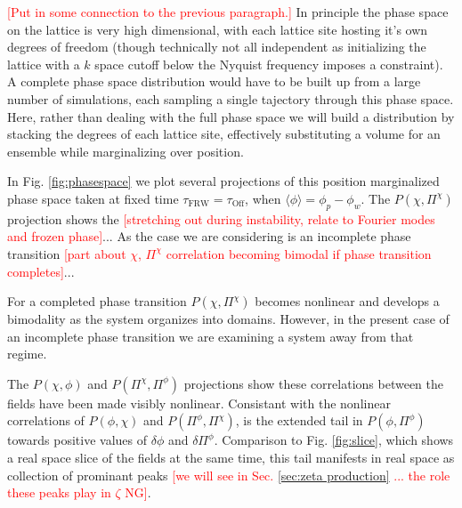 
\textcolor{red}{[Put in some connection to the previous paragraph.]}
In principle the phase space on the lattice is very high dimensional, with each lattice site hosting it's own degrees of freedom (though technically not all independent as initializing the lattice with a $k$ space cutoff below the Nyquist frequency imposes a constraint). A complete phase space distribution would have to be built up from a large number of simulations, each sampling a single tajectory through this phase space. Here, rather than dealing with the full phase space we will build a distribution by stacking the degrees of each lattice site, effectively substituting a volume for an ensemble while marginalizing over position.

In Fig. \ref{fig:phasespace} we plot several projections of this position marginalized phase space taken at fixed time $\tau_\mathrm{FRW} = \tau_\mathrm{Off}$, when $\langle\phi\rangle = \phi_p - \phi_w$. The $P(\chi,\Pi^\chi)$ projection shows the \textcolor{red}{[stretching out during instability, relate to Fourier modes and frozen phase]}... As the case we are considering is an incomplete phase transition \textcolor{red}{[part about $\chi$, $\Pi^\chi$ correlation becoming bimodal if phase transition completes]}...

For a completed phase transition $P(\chi,\Pi^\chi)$ becomes nonlinear and develops a bimodality as the system organizes into domains. However, in the present case of an incomplete phase transition we are examining a system away from that regime.

The $P(\chi,\phi)$ and $P(\Pi^\chi,\Pi^\phi)$ projections show these correlations between the fields have been made visibly nonlinear. Consistant with the nonlinear correlations of $P(\phi,\chi)$ and $P(\Pi^\phi,\Pi^\chi)$, is the extended tail in $P(\phi,\Pi^\phi)$ towards positive values of $\delta\phi$ and $\delta\Pi^\phi$. Comparison to Fig. \ref{fig:slice}, which shows a real space slice of the fields at the same time, this tail manifests in real space as collection of prominant peaks \textcolor{red}{[we will see in Sec. \ref{sec:zeta production} ... the role these peaks play in $\zeta$ NG]}. 


